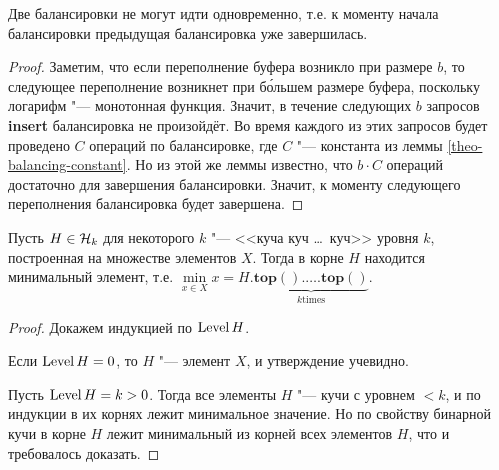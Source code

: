 \begin{lem} \label{theo-single-bal}
Две балансировки не могут идти одновременно, т.е.
к моменту начала балансировки предыдущая балансировка уже завершилась.
\end{lem}
\begin{proof}
Заметим, что если переполнение буфера возникло при размере $b$, то следующее
переполнение возникнет при б\'ольшем размере буфера, поскольку логарифм "---
монотонная функция. Значит, в течение следующих $b$ запросов \textbf{insert}
балансировка не произойдёт. Во время каждого из этих запросов будет проведено
$C$ операций по балансировке, где $C$ "--- константа из леммы \ref{theo-balancing-constant}.
Но из этой же леммы известно, что $b \cdot C$ операций достаточно для завершения
балансировки. Значит, к моменту следующего переполнения балансировка будет завершена.
\end{proof}

\begin{lem} \label{theo-hk-top-is-min}
Пусть $H \in \mathcal{H}_k$ для некоторого $k$ "--- <<куча куч \dots\ куч>> уровня $k$,
построенная на множестве элементов $X$. Тогда в корне $H$ находится минимальный элемент,
т.е. $\min\limits_{x\in X} x = H.\underbrace{\mathbf{top}().\dots.\mathbf{top}()}_{k \mathrm{ times}}$.
\end{lem}
\begin{proof}
Докажем индукцией по $\operatorname{Level} H$.

Если $\operatorname{Level} H = 0$, то $H$ "--- элемент $X$, и утверждение учевидно.

Пусть $\operatorname{Level} H = k > 0$. Тогда все элементы $H$ "--- кучи с уровнем $<k$,
и по индукции в их корнях лежит минимальное значение. Но по свойству
бинарной кучи в корне $H$ лежит минимальный из корней всех
элементов $H$, что и требовалось доказать.
\end{proof}

